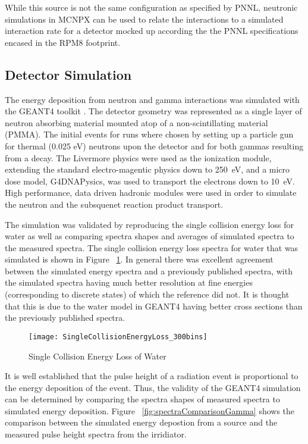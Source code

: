 \documentclass[draftcls,onecolumn]{IEEEtran}
\begin{document}
While this source is not the same configuration as specified by PNNL, neutronic simulations in MCNPX can be used to relate the interactions to a simulated interaction rate for a detector mocked up according the the PNNL specifications encased in the RPM8 footprint.

\subsection{Detector Simulation}
The energy deposition from neutron and gamma interactions was simulated with the GEANT4 toolkit \cite{agostinelli_geant4simulation_2003}.
The detector geometry was represented as a single layer of neutron absorbing material mounted atop of a non-scintillating material (PMMA).
The initial events for runs where chosen by setting up a particle gun for thermal (0.025 eV) neutrons upon the detector and for both gammas resulting from a  decay.
The Livermore physics were used as the ionization module, extending the standard electro-magentic physics down to \SI{250}{\eV}, and a micro dose model, G4DNAPysics, was used to transport the electrons down to \SI{10}{\eV}.
High performance, data driven hadronic modules were used in order to simulate the neutron and the subsquenet reaction product transport.

The simulation was validated by reproducing the single collision energy loss for water as well as comparing spectra shapes and averages of simulated spectra to the measured spectra.
The single collision energy loss spectra for water that was simulated is shown in Figure ~\ref{fig:SingleCollisionELossWater}.
In general there was excellent agreement between the simulated energy spectra and a previously published spectra\cite{turner_comparative_1982}, with the simulated spectra having much better resolution at fine energies (corresponding to discrete states) of which the reference did not.
It is thought that this is due to the water model in GEANT4 having better cross sections than the previously published spectra.
\begin{figure}[ht]
  \centering
  \texttt{[image: SingleCollisionEnergyLoss\_300bins]}
  \caption{Single Collision Energy Loss of Water}
	\label{fig:SingleCollisionELossWater}
\end{figure}

It is well established that the pulse height of a radiation event is proportional to the energy deposition of the event\cite{birks_scintillations_1951}.
Thus, the validity of the GEANT4 simulation can be determined by comparing the spectra shapes of measured spectra to simulated energy deposition.
Figure ~\ref{fig:spectraComparisonGamma} shows the comparison between the simulated energy depostion from a  source and the measured pulse height spectra from the  irridiator.
\end{document}
